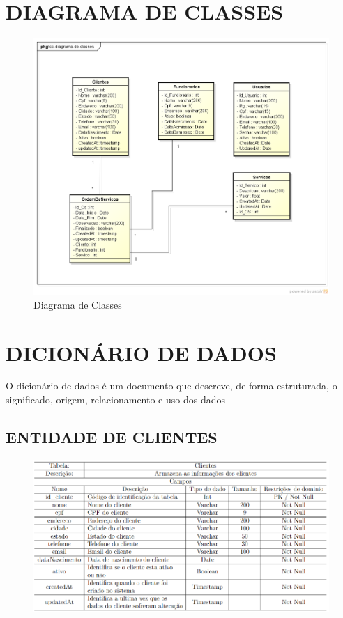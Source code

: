 \newpage
\section{DIAGRAMA DE CLASSES}
\begin{figure}[htb]
	\caption{\label{fig_diagrama-classes} Diagrama de Classes}
	\begin{center}
	    \includegraphics[width=1\linewidth]{imagens/diagrama-de-classes.png}
	\end{center}
\end{figure}

\newpage
\section{DICIONÁRIO DE DADOS}
O dicionário de dados é um documento que descreve, de forma estruturada, o significado, origem, relacionamento e uso dos dados

\newpage
\subsection{ENTIDADE DE CLIENTES}
\begin{figure}[htb]
	\begin{center}
	    \includegraphics[width=0.8\linewidth]{imagens/dc1.png}
	\end{center}
\end{figure}

